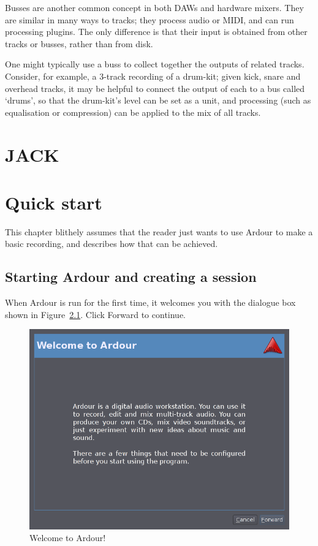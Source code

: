 \documentclass{book}
\newcommand{\button}[1]{#1}
\begin{document}
Busses are another common concept in both DAWs and hardware mixers.
They are similar in many ways to tracks; they process audio or MIDI,
and can run processing plugins.  The only difference is that their
input is obtained from other tracks or busses, rather than from disk.

One might typically use a buss to collect together the outputs of
related tracks.  Consider, for example, a 3-track recording of a
drum-kit; given kick, snare and overhead tracks, it may be helpful to
connect the output of each to a bus called `drums', so that the
drum-kit's level can be set as a unit, and processing (such as
equalisation or compression) can be applied to the mix of all tracks.


\chapter{JACK}
\label{ch:jack}

\chapter{Quick start}

This chapter blithely assumes that the reader just wants to use Ardour
to make a basic recording, and describes how that can be achieved.

\section{Starting Ardour and creating a session}

When Ardour is run for the first time, it welcomes you with the dialogue box
shown in Figure~\ref{fig:welcome-to-ardour}.  Click \button{Forward} to continue.

\begin{figure}[ht]
\begin{center}
\includegraphics[scale=0.5]{screenshots/welcome-to-ardour.png}
\end{center}
\caption{Welcome to Ardour!}
\label{fig:welcome-to-ardour}
\end{figure}
\end{document}
